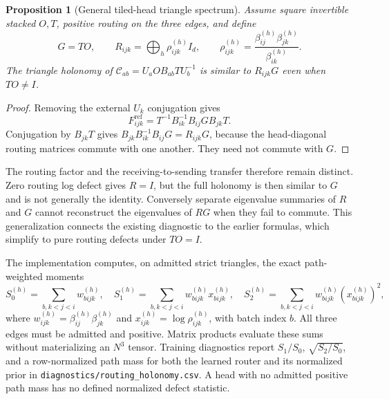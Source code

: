 \documentclass[11pt]{article}
\newtheorem{proposition}[theorem]{Proposition}
\theoremstyle{definition}
\theoremstyle{remark}
\providecommand{\cfg}[1]{{\small\texttt{#1}}}
\begin{document}
\begin{proposition}[General tiled-head triangle spectrum]
\label{links:prop:general_head_holonomy}
Assume square invertible stacked $O,T$, positive routing on the three edges, and define
\begin{equation}
G=TO,\qquad R_{ijk}=\bigoplus_h\rho_{ijk}^{(h)}I_d,
\qquad \rho_{ijk}^{(h)}=\frac{\beta_{ij}^{(h)}\beta_{jk}^{(h)}}{\beta_{ik}^{(h)}}.
\label{links:eq:rho_transfer}
\end{equation}
The triangle holonomy of $\mathcal C_{ab}=U_aOB_{ab}TU_b^{-1}$ is similar to $R_{ijk}G$ even when $TO\ne I$.
\end{proposition}
\begin{proof}
Removing the external $U_k$ conjugation gives
\begin{equation}
F^{\mathrm{ref}}_{ijk}
=T^{-1}B_{ik}^{-1}B_{ij}G B_{jk}T.
\label{links:eq:general_head_product}
\end{equation}
Conjugation by $B_{jk}T$ gives $B_{jk}B_{ik}^{-1}B_{ij}G=R_{ijk}G$, because the head-diagonal routing matrices commute with one another. They need not commute with $G$.
\end{proof}

The routing factor and the receiving-to-sending transfer therefore remain distinct. Zero routing log defect gives $R=I$, but the full holonomy is then similar to $G$ and is not generally the identity. Conversely separate eigenvalue summaries of $R$ and $G$ cannot reconstruct the eigenvalues of $RG$ when they fail to commute. This generalization connects the existing diagnostic to the earlier formulas, which simplify to pure routing defects under $TO=I$.

The implementation computes, on admitted strict triangles, the exact path-weighted moments
\begin{equation}
S_0^{(h)}=\sum_{b,k<j<i}w_{bijk}^{(h)},\quad
S_1^{(h)}=\sum_{b,k<j<i}w_{bijk}^{(h)}x_{bijk}^{(h)},\quad
S_2^{(h)}=\sum_{b,k<j<i}w_{bijk}^{(h)}(x_{bijk}^{(h)})^2,
\label{links:eq:diagnostic_moments}
\end{equation}
where $w_{ijk}^{(h)}=\beta_{ij}^{(h)}\beta_{jk}^{(h)}$ and $x_{ijk}^{(h)}=\log\rho_{ijk}^{(h)}$, with batch index $b$. All three edges must be admitted and positive. Matrix products evaluate these sums without materializing an $N^3$ tensor. Training diagnostics report $S_1/S_0$, $\sqrt{S_2/S_0}$, and a row-normalized path mass for both the learned router and its normalized prior in \cfg{diagnostics/routing\_holonomy.csv}. A head with no admitted positive path mass has no defined normalized defect statistic.
\end{document}
